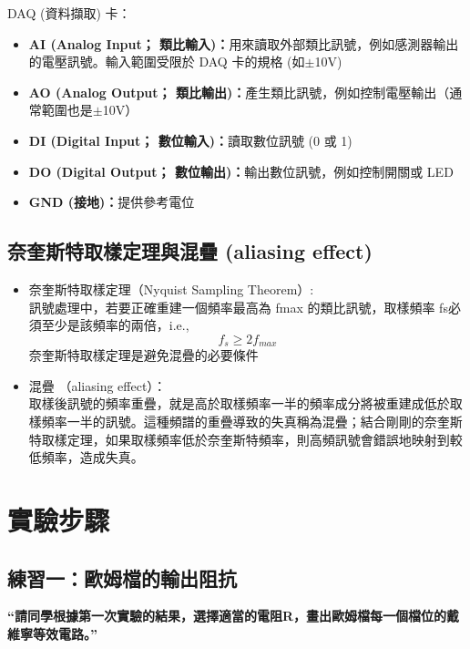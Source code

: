 \documentclass[12pt,a4paper]{article}
\begin{document}
\begin{CJK}{UTF8}{bkai}
DAQ (資料擷取) 卡：
\begin{itemize}
    \item \textbf{AI (Analog Input； 類比輸入)：}用來讀取外部類比訊號，例如感測器輸出的電壓訊號。輸入範圍受限於 DAQ 卡的規格 (如$\pm$10V)
    \item \textbf{AO (Analog Output； 類比輸出)：}產生類比訊號，例如控制電壓輸出（通常範圍也是$\pm$10V）
    \item \textbf{DI (Digital Input； 數位輸入)：}讀取數位訊號 (0 或 1)
    \item \textbf{DO (Digital Output； 數位輸出)：}輸出數位訊號，例如控制開關或 LED
    \item \textbf{GND (接地)：}提供參考電位

\end{itemize}

\subsection{奈奎斯特取樣定理與混疊 (aliasing effect)}\label{subsec:ny}
\hfill

\begin{itemize}
    \item 奈奎斯特取樣定理（Nyquist Sampling Theorem）:\\
    訊號處理中，若要正確重建一個頻率最高為 fmax 的類比訊號，取樣頻率 fs必須至少是該頻率的兩倍，i.e.,
    \begin{equation*}
    f_{s} \ge 2f_{max}
    \end{equation*}
    奈奎斯特取樣定理是避免混疊的必要條件
    \item 混疊 （aliasing effect）：\\
    取樣後訊號的頻率重疊，就是高於取樣頻率一半的頻率成分將被重建成低於取樣頻率一半的訊號。這種頻譜的重疊導致的失真稱為混疊；結合剛剛的奈奎斯特取樣定理，如果取樣頻率低於奈奎斯特頻率，則高頻訊號會錯誤地映射到較低頻率，造成失真。
\end{itemize}


\clearpage
\section{實驗步驟}

\subsection{練習一：歐姆檔的輸出阻抗}\label{subsec:step_1}
\hfill

\textbf{“請同學根據第一次實驗的結果，選擇適當的電阻R，畫出歐姆檔每一個檔位的戴維寧等效電路。”}


\end{CJK}
\end{document}
